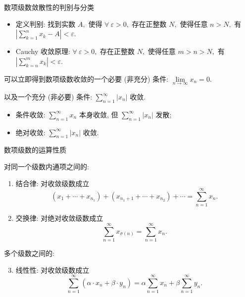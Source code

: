 
\begin{frame}{数项级数敛散性的判别与分类}

\begin{itemize}[<+->]
\item 定义判别: 找到实数 $A,$ 使得 $\forall~\varepsilon > 0,$ 存在正整数 $N,$ 使得任意 $n > N,$ 有 $\left\lvert \sum\limits_{k=1}^n x_k - A \right\rvert < \varepsilon.$
\item Cauchy 收敛原理: $\forall~\varepsilon > 0,$ 存在正整数 $N,$ 使得任意 $m > n > N,$ 有 $\left\lvert \sum\limits_{k=n}^m x_k \right\rvert < \varepsilon.$
\end{itemize}


可以立即得到数项级数收敛的一个必要 (非充分) 条件: $\lim\limits_{n\to\infty} x_n = 0.$

\pause

以及一个充分 (非必要) 条件: $\sum\limits_{n=1}^\infty \lvert x_n \rvert$ 收敛.

\pause

\begin{Def}
\begin{itemize}[<+->]
\item 条件收敛: $\sum\limits_{n=1}^\infty x_n$ 本身收敛, 但 $\sum\limits_{n=1}^\infty \lvert x_n \rvert$ 发散;
\item 绝对收敛: $\sum\limits_{n=1}^\infty \lvert x_n \rvert$ 收敛.
\end{itemize}
\end{Def}

\end{frame}


\begin{frame}{数项级数的运算性质}

对同一个级数内通项之间的:
\pause
\begin{enumerate}[<+->]
\item 结合律: 对收敛级数成立
\[(x_1 + \cdots + x_{n_1}) + (x_{n_1+1} + \cdots + x_{n_2}) + \cdots = \sum\limits_{n=1}^\infty x_n.\]
\item 交换律: 对绝对收敛级数成立
\[\sum\limits_{n=1}^\infty x_{\sigma(n)} = \sum\limits_{n=1}^\infty x_n.\]
\end{enumerate}


多个级数之间的:
\pause
\begin{enumerate}[<+->]
\setcounter{enumi}{2}
\item 线性性: 对收敛级数成立
\[\sum\limits_{n=1}^\infty \left( \alpha \cdot x_n + \beta \cdot y_n \right) = \alpha \sum\limits_{n=1}^\infty x_n + \beta \sum\limits_{n=1}^\infty y_n.\]
\end{enumerate}

\end{frame}

